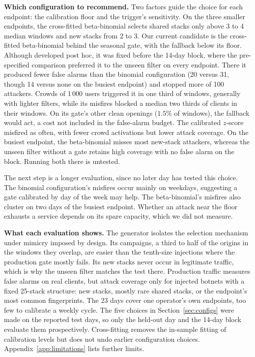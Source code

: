 \documentclass[conference,letterpaper,10pt]{IEEEtran}
\newcommand\1{\textit{(i)}}
\newcommand\2{\textit{(ii)}}
\newcommand\3{\textit{(iii)}}
\newcommand\4{\textit{(iv)}}
\newcommand\5{\textit{(v)}}
\newcommand\6{\textit{(vi)}}
\newcommand\7{\textit{(vii)}}
\newcommand\8{\textit{(viii)}}
\newcommand\9{\textit{(ix)}}
\begin{document}
\textbf{Which configuration to recommend.}
Two factors guide the choice for each endpoint:
the calibration floor and the trigger's sensitivity.
On the three smaller endpoints, the cross-fitted
beta-binomial selects shared stacks only above
3 to 4 median windows and new stacks from 2 to 3. Our
current candidate is the cross-fitted
beta-binomial behind the seasonal gate, with the fallback
below its floor. Although developed post hoc, it was fixed
before the 14-day block, where the pre-specified comparison
preferred it to the unseen filter on every endpoint. There
it produced fewer
false alarms than the
binomial configuration (20 versus 31, though 14 versus none
on the busiest endpoint) and stopped more of 100 attackers.
Crowds of 1\,000 users triggered it in one third
of windows, generally with lighter filters,
while its misfires blocked a median two thirds of clients in
their windows. On its gate's other clean openings ($1.5\%$
of windows), the fallback would act, a cost not included in
the false-alarm budget. The calibrated $z$-score misfired as
often, with fewer crowd activations but lower attack
coverage.
On the busiest endpoint, the beta-binomial
misses most new-stack attackers, whereas the unseen filter
without a gate retains high coverage with no false alarm on
the block.
Running both there is untested.

The next step is a longer evaluation, since no later day has
tested this choice.
The binomial configuration's misfires occur
mainly on weekdays, suggesting a gate calibrated by day of
the week may help.
The beta-binomial's misfires also cluster
on two days of the busiest endpoint.
Whether an attack near the floor exhausts a service depends on its spare
capacity, which we did not measure.

\textbf{What each evaluation shows.}
The generator isolates the selection mechanism
under mimicry imposed by design.
Its campaigns, a third to half of the origins in the windows
they overlap, are easier than the tenth-size injections
where the production gate mostly fails. Its new stacks
never occur in legitimate traffic, which is why the unseen
filter matches the test there. Production traffic
measures false alarms on real clients, but
attack coverage only for injected botnets
with a fixed 25-stack structure: new stacks,
mostly rare shared stacks, or the endpoint's
most common fingerprints. The 23 days cover one operator's
own endpoints, too few to calibrate a weekly cycle.
The five choices in Section~\ref{sec:configs}
were made on the reported test days,
so only the held-out day and the 14-day
block evaluate them prospectively.
Cross-fitting removes the in-sample fitting
of calibration levels but does not undo
earlier configuration choices.
Appendix~\ref{app:limitations} lists further limits.
\end{document}
